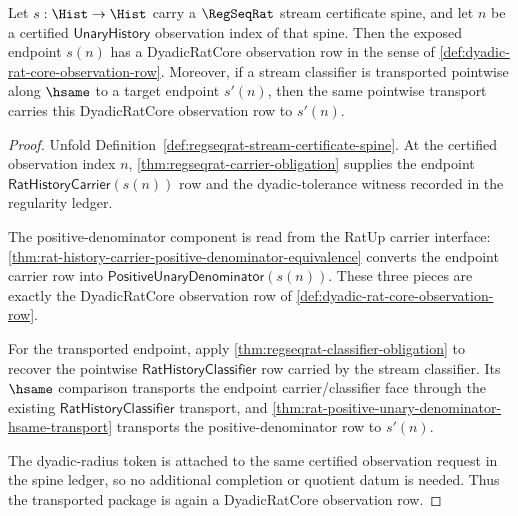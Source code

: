 \begin{theorem}
\label{thm:regseqrat-dyadic-observation-coverage}
Let $s:\Hist\to\Hist$ carry a $\RegSeqRat$ stream certificate spine, and let
$n$ be a certified $\mathsf{UnaryHistory}$ observation index of that spine. Then
the exposed endpoint $s(n)$ has a DyadicRatCore observation row in the sense of
\autoref{def:dyadic-rat-core-observation-row}. Moreover, if a stream classifier
is transported pointwise along $\hsame$ to a target endpoint $s'(n)$, then the
same pointwise transport carries this DyadicRatCore observation row to
$s'(n)$.
\end{theorem}
\begin{proof}
Unfold Definition~\ref{def:regseqrat-stream-certificate-spine}. At the
certified observation index $n$, \autoref{thm:regseqrat-carrier-obligation}
supplies the endpoint $\mathsf{RatHistoryCarrier}(s(n))$ row and the
dyadic-tolerance witness recorded in the regularity ledger.

The positive-denominator component is read from the RatUp carrier interface:
\autoref{thm:rat-history-carrier-positive-denominator-equivalence} converts the
endpoint carrier row into $\mathsf{PositiveUnaryDenominator}(s(n))$. These
three pieces are exactly the DyadicRatCore observation row of
\autoref{def:dyadic-rat-core-observation-row}.

For the transported endpoint, apply
\autoref{thm:regseqrat-classifier-obligation} to recover the pointwise
$\mathsf{RatHistoryClassifier}$ row carried by the stream classifier. Its
$\hsame$ comparison transports the endpoint carrier/classifier face through the
existing $\mathsf{RatHistoryClassifier}$ transport, and
\autoref{thm:rat-positive-unary-denominator-hsame-transport} transports the
positive-denominator row to $s'(n)$.

The dyadic-radius token is attached to the same certified observation request
in the spine ledger, so no additional completion or quotient datum is needed.
Thus the transported package is again a DyadicRatCore observation row.
\end{proof}


